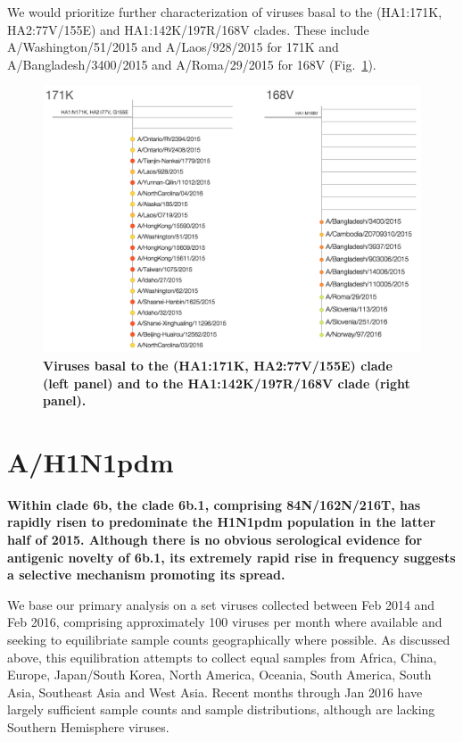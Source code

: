 \documentclass[11pt,oneside,letterpaper]{article}
\begin{document}
We would prioritize further characterization of viruses basal to the (HA1:171K, HA2:77V/155E) and HA1:142K/197R/168V clades. These include A/Washington/51/2015 and A/Laos/928/2015 for 171K and A/Bangladesh/3400/2015 and A/Roma/29/2015 for 168V (Fig.\ \ref{H3N2_basal_viruses}).

\begin{figure}[h!]
	\centering		
	\includegraphics[width=1.0\textwidth]{../figures/feb-2016/H3N2_basal_viruses.png}
	\caption{\textbf{Viruses basal to the (HA1:171K, HA2:77V/155E) clade (left panel) and to the HA1:142K/197R/168V clade (right panel).} 
	}
	\label{H3N2_basal_viruses}
\end{figure}

\clearpage
\pagebreak

\section*{A/H1N1pdm}

\textbf{Within clade 6b, the clade 6b.1, comprising 84N/162N/216T, has rapidly risen to predominate the H1N1pdm population in the latter half of 2015. Although there is no obvious serological evidence for antigenic novelty of 6b.1, its extremely rapid rise in frequency suggests a selective mechanism promoting its spread.}

We base our primary analysis on a set viruses collected between Feb 2014 and Feb 2016, comprising approximately 100 viruses per month where available and seeking to equilibriate sample counts geographically where possible. As discussed above, this equilibration attempts to collect equal samples from Africa, China, Europe, Japan/South Korea, North America, Oceania, South America, South Asia, Southeast Asia and West Asia. Recent months through Jan 2016 have largely sufficient sample counts and sample distributions, although are lacking Southern Hemisphere viruses.
\end{document}
